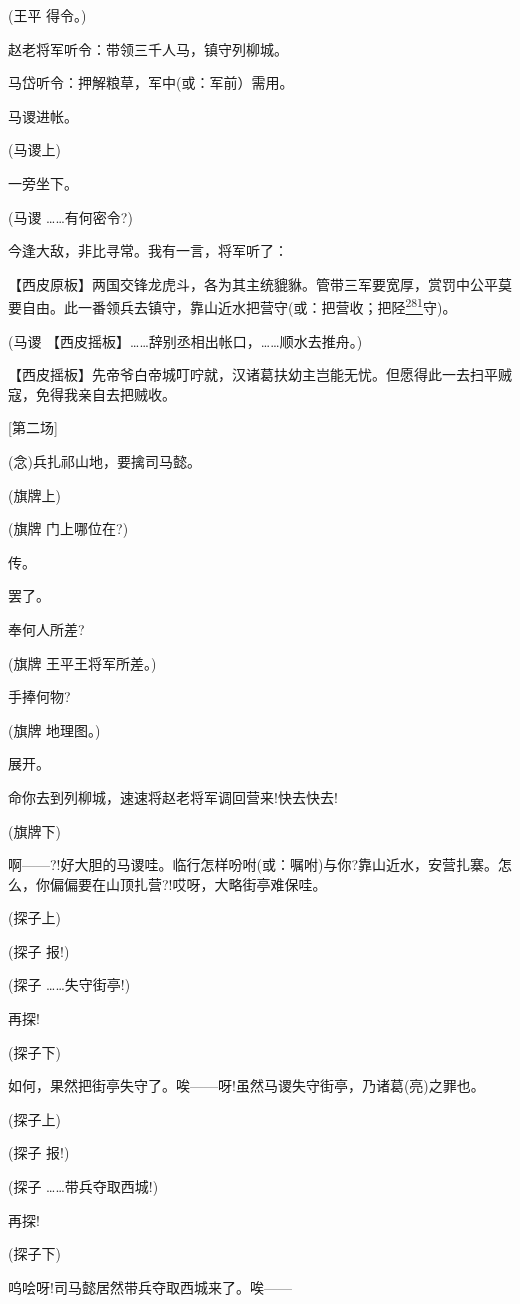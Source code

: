 (王平 得令。)

赵老将军听令：带领三千人马，镇守列柳城。

马岱听令：押解粮草，军中(或：军前）需用。

马谡进帐。

(马谡上)

一旁坐下。

(马谡 \ldots{}\ldots{}有何密令?)

今逢大敌，非比寻常。我有一言，将军听了：

【西皮原板】两国交锋龙虎斗，各为其主统貔貅。管带三军要宽厚，赏罚中公平莫要自由。此一番领兵去镇守，靠山近水把营守(或：把营收；把陉\protect\hyperlink{fn281}{\textsuperscript{281}}守)。

(马谡
【西皮摇板】\ldots{}\ldots{}辞别丞相出帐口，\ldots{}\ldots{}顺水去推舟。)

【西皮摇板】先帝爷白帝城叮咛就，汉诸葛扶幼主岂能无忧。但愿得此一去扫平贼寇，免得我亲自去把贼收。

{[}第二场{]}

(念)兵扎祁山地，要擒司马懿。

(旗牌上)

(旗牌 门上哪位在?)

传。

罢了。

奉何人所差?

(旗牌 王平王将军所差。)

手捧何物?

(旗牌 地理图。)

展开。

命你去到列柳城，速速将赵老将军调回营来!快去快去!

(旗牌下)

啊------?!好大胆的马谡哇。临行怎样吩咐(或：嘱咐)与你?靠山近水，安营扎寨。怎么，你偏偏要在山顶扎营?!哎呀，大略街亭难保哇。

(探子上)

(探子 报!)

(探子 \ldots{}\ldots{}失守街亭!)

再探!

(探子下)

如何，果然把街亭失守了。唉------呀!虽然马谡失守街亭，乃诸葛(亮)之罪也。

(探子上)

(探子 报!)

(探子 \ldots{}\ldots{}带兵夺取西城!)

再探!

(探子下)

呜哙呀!司马懿居然带兵夺取西城来了。唉------

